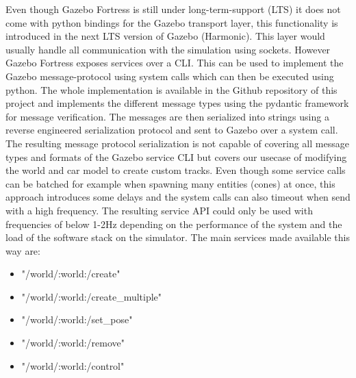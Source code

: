 Even though Gazebo Fortress is still under long-term-support (LTS) it does not come with python bindings for the Gazebo transport layer, this functionality is introduced in the next LTS version of Gazebo (Harmonic).
This layer would usually handle all communication with the simulation using sockets.
However Gazebo Fortress exposes services over a CLI. This can be used to implement the Gazebo message-protocol using system calls which can then be executed using python. 
The whole implementation is available in the Github repository of this project and implements the different message types using the pydantic framework for message verification. 
The messages are then serialized into strings using a reverse engineered serialization protocol and sent to Gazebo over a system call. 
The resulting message protocol serialization is not capable of covering all message types and formats of the Gazebo service CLI but covers our usecase of modifying the world and car model to create custom tracks.
Even though some service calls can be batched for example when spawning many entities (cones) at once, 
this approach introduces some delays and the system calls can also timeout when send with a high frequency. The resulting service API could only be used with frequencies of below 1-2Hz depending on the performance of the system and the load of the software stack on the simulator. 
\newline
The main services made available this way are:

\begin{itemize}
\item "/world/:world:/create"
\item "/world/:world:/create\_multiple"
\item "/world/:world:/set\_pose"
\item "/world/:world:/remove"
\item "/world/:world:/control"
\end{itemize}


